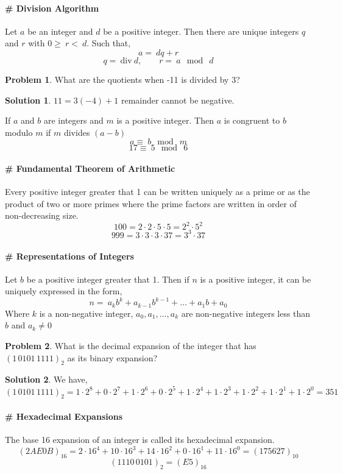 \documentclass[12pt,oneside,a4paper]{book}
\theoremstyle{remark}
\theoremstyle{definition}
\newtheorem{prob}{Problem}[section]
\newtheorem*{soln}{Solution}
\begin{document}
\paragraph{\# Division Algorithm} Let $ a $ be an integer and $ d $ be a positive integer.
Then there are unique integers $ q $ and $ r $ with \(0\geq\ r <\ d\).
Such that,
\[a=\ dq+r\]
\[q=\ \text{div}\ d,\qquad r=\ a \mod \ d\]
\begin{prob}
    What are the quotients when -11 is divided by 3?
\end{prob}
\begin{soln}
    \(11=3(-4)+1\) remainder cannot be negative.
\end{soln}
If $ a $ and $ b $ are integers and $ m $ is a positive integer.
Then $ a $ is congruent to $ b $ modulo $ m $ if $ m $ divides $ (a-b) $
\[a\equiv\ b \mod\ m\]\[17\equiv\ 5 \mod\ 6\]
\paragraph{\# Fundamental Theorem of Arithmetic} Every positive integer greater that 1 can be written uniquely as a prime or as the product of two or more primes where the prime factors are written in order of non-decreasing size.
\[100=2\cdot2\cdot5\cdot5=2^2\cdot5^2\]\[999=3\cdot3\cdot3\cdot37=3^3 \cdot37\]

\paragraph{\# Representations of Integers} Let $ b $ be a positive integer greater that 1. Then if $ n $ is a positive integer, it can be uniquely expressed in the form,
\[n=\ a_k b^k+a_{k-1} b^{k-1}+\dots +a_1 b+a_0\]
Where $ k $ is a non-negative integer, \(a_0,a_1,\dots,a_k\) are non-negative integers less than $ b $ and \(a_k\neq0\)
\begin{prob}
    What is the decimal expansion of the integer that has \((1\,0101\,1111)_2\) as its binary expansion?
\end{prob}
\begin{soln}
    We have,
    \[(1\,0101\,1111)_2=1\cdot 2^8+0\cdot2^7+1\cdot2^6+0\cdot2^5+1\cdot2^4+1\cdot2^3+1\cdot2^2+1\cdot2^1+1\cdot2^0=351\]
\end{soln}
\paragraph{\# Hexadecimal Expansions} The base 16 expansion of an integer is called its hexadecimal expansion.
\[(2AE0B)_{16}=2\cdot16^4+10\cdot16^3+14\cdot16^2+0\cdot16^1+11\cdot16^0=(175627)_{10}\]
\[(1110\,0101)_{2}=(E5)_{16}\]
\end{document}
